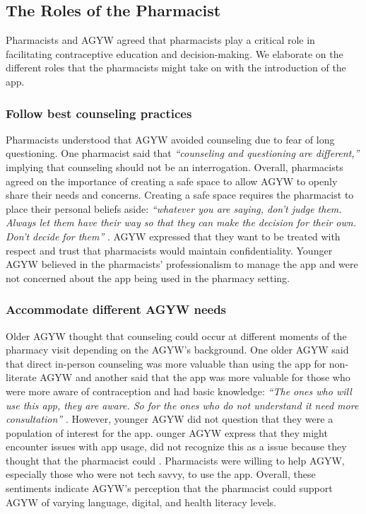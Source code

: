 \subsection{The Roles of the Pharmacist}
Pharmacists and AGYW agreed that pharmacists play a critical role in facilitating contraceptive education and decision-making. We elaborate on the different roles that the pharmacists might take on with the introduction of the app.

\subsubsection{Follow best counseling practices}

Pharmacists understood that AGYW avoided counseling due to fear of long questioning. One pharmacist said that \textit{``counseling and questioning are different,”} implying that counseling should not be an interrogation. Overall, pharmacists agreed on the importance of creating a safe space to allow AGYW to openly share their needs and concerns. Creating a safe space requires the pharmacist to place their personal beliefs aside: \textit{``whatever you are saying, don't judge them. Always let them have their way so that they can make the decision for their own. Don't decide for them”} . AGYW expressed that they want to be treated with respect and trust that pharmacists would maintain confidentiality.  Younger AGYW believed in the pharmacists’ professionalism to manage the app and were not concerned about the app being used in the pharmacy setting. 

\subsubsection{Accommodate different AGYW needs}

Older AGYW thought that counseling could occur at different moments of the pharmacy visit depending on the AGYW’s background. One older AGYW said that direct in-person counseling was more valuable than using the app for non-literate AGYW and another said that the app was more valuable for those who were more aware of contraception and had basic knowledge: \textit{``The ones who will use this app, they are aware. So for the ones who do not understand it need more consultation”} . However, younger AGYW did not question that they were a population of interest for the app. ounger AGYW express that they might encounter issues with app usage,  did not recognize this as a  issue because they thought that the pharmacist could . Pharmacists were willing to help AGYW, especially those who were not tech savvy, to use the app. Overall, these sentiments indicate AGYW’s perception that the pharmacist could support AGYW of varying language, digital, and health literacy levels. 

